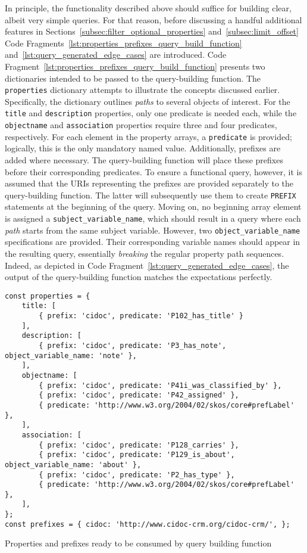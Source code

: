 In principle, the functionality described above should suffice for building clear, albeit very simple queries. For that reason, before discussing a handful additional features in Sections~\ref{subsec:filter_optional_properties} and~\ref{subsec:limit_offset} Code Fragments~\ref{lst:properties_prefixes_query_build_function} and~\ref{lst:query_generated_edge_cases} are introduced. Code Fragment~\ref{lst:properties_prefixes_query_build_function} presents two dictionaries intended to be passed to the query-building function. The \texttt{properties} dictionary attempts to illustrate the concepts discussed earlier. Specifically, the dictionary outlines \textit{paths} to several objects of interest. For the \texttt{title} and \texttt{description} properties, only one predicate is needed each, while the \texttt{objectname} and \texttt{association} properties require three and four predicates, respectively. For each element in the property arrays, a \texttt{predicate} is provided; logically, this is the only mandatory named value. Additionally, prefixes are added where necessary. The query-building function will place these prefixes before their corresponding predicates. To ensure a functional query, however, it is assumed that the URIs representing the prefixes are provided separately to the query-building function. The latter will subsequently use them to create \texttt{PREFIX} statements at the beginning of the query. Moving on, no beginning array element is assigned a \texttt{subject_variable_name}, which should result in a query where each \textit{path} starts from the same subject variable. However, two \texttt{object_variable_name} specifications are provided. Their corresponding variable names should appear in the resulting query, essentially \textit{breaking} the regular property path sequences. Indeed, as depicted in Code Fragment~\ref{lst:query_generated_edge_cases}, the output of the query-building function matches the expectations perfectly.

\begin{listing}[htbp]
    \begin{verbatim}
const properties = {
    title: [
        { prefix: 'cidoc', predicate: 'P102_has_title' }
    ],
    description: [
        { prefix: 'cidoc', predicate: 'P3_has_note', object_variable_name: 'note' },
    ],
    objectname: [
        { prefix: 'cidoc', predicate: 'P41i_was_classified_by' },
        { prefix: 'cidoc', predicate: 'P42_assigned' },
        { predicate: 'http://www.w3.org/2004/02/skos/core#prefLabel' },
    ],
    association: [
        { prefix: 'cidoc', predicate: 'P128_carries' },
        { prefix: 'cidoc', predicate: 'P129_is_about', object_variable_name: 'about' },
        { prefix: 'cidoc', predicate: 'P2_has_type' },
        { predicate: 'http://www.w3.org/2004/02/skos/core#prefLabel' },
    ],
};
const prefixes = { cidoc: 'http://www.cidoc-crm.org/cidoc-crm/', };
    \end{verbatim}
    \caption{Properties and prefixes ready to be consumed by query building function}
    \label{lst:properties_prefixes_query_build_function}
\end{listing}

